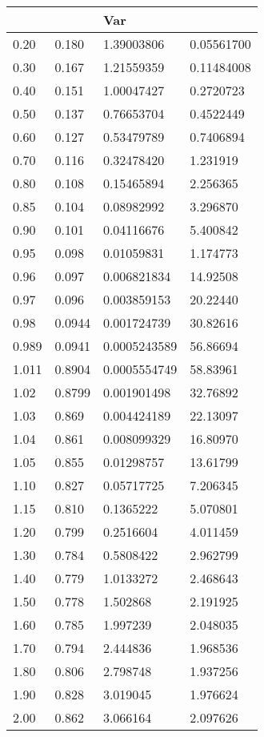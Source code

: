 \documentclass[oneside,10pt]{article}
\begin{document}
\begin{table}[h]
\caption{\small
 }
\begin{center}{\scriptsize
\begin{tabular}{l l l l}
\hline \hline
 &  &Var  & \\\hline
0.20 &0.180& 1.39003806& 0.05561700\\
0.30 &0.167& 1.21559359& 0.11484008\\
0.40 &0.151& 1.00047427& 0.2720723\\
0.50 &0.137& 0.76653704& 0.4522449\\
0.60 &0.127& 0.53479789& 0.7406894\\
0.70 &0.116& 0.32478420& 1.231919\\
0.80 &0.108& 0.15465894& 2.256365\\
0.85 &0.104& 0.08982992& 3.296870\\
0.90 &0.101& 0.04116676& 5.400842\\
0.95 &0.098& 0.01059831 &1.174773\\
0.96 &0.097& 0.006821834 & 14.92508\\
0.97 &0.096& 0.003859153 &20.22440\\
0.98   &0.0944& 0.001724739&    30.82616\\
0.989 & 0.0941& 0.0005243589& 56.86694\\
1.011 & 0.8904& 0.0005554749& 58.83961\\
1.02 & 0.8799& 0.001901498&  32.76892\\
1.03  & 0.869& 0.004424189& 22.13097\\
1.04 &0.861& 0.008099329& 16.80970\\
1.05 & 0.855& 0.01298757& 13.61799\\
1.10 &0.827& 0.05717725& 7.206345\\
1.15 &0.810& 0.1365222& 5.070801\\
1.20 &0.799& 0.2516604& 4.011459\\
1.30 &0.784& 0.5808422& 2.962799\\
1.40 &0.779& 1.0133272& 2.468643\\
1.50 &0.778& 1.502868& 2.191925\\
1.60 &0.785 &1.997239& 2.048035\\
1.70 & 0.794 &2.444836& 1.968536\\
1.80 &0.806 &2.798748& 1.937256\\
1.90 &0.828 &3.019045& 1.976624\\
2.00 &0.862 &3.066164& 2.097626\\
\hline\hline
\end{tabular}
}
\end{center}
\label{tab_oq}
\end{table}
\end{document}
